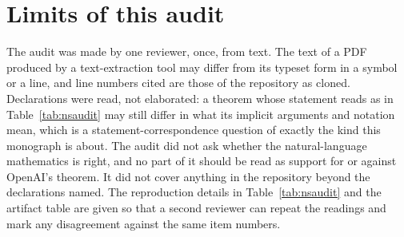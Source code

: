 \section{Limits of this audit}

The audit was made by one reviewer, once, from text. The text of a PDF produced by a text-extraction tool may differ from its typeset form in a symbol or a line, and line numbers cited are those of the repository as cloned. Declarations were read, not elaborated: a theorem whose statement reads as in Table~\ref{tab:nsaudit} may still differ in what its implicit arguments and notation mean, which is a statement-correspondence question of exactly the kind this monograph is about. The audit did not ask whether the natural-language mathematics is right, and no part of it should be read as support for or against OpenAI's theorem. It did not cover anything in the repository beyond the declarations named. The reproduction details in Table~\ref{tab:nsaudit} and the artifact table are given so that a second reviewer can repeat the readings and mark any disagreement against the same item numbers.

